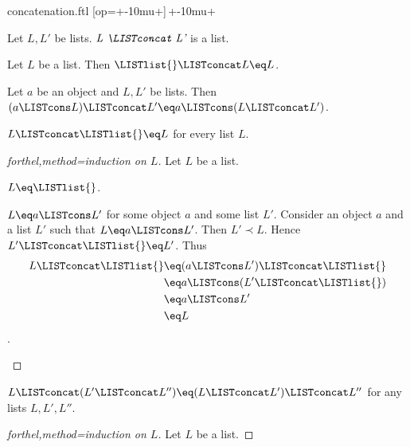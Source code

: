 \documentclass[lang=en,debug=all]{stex}
\begin{document}
\begin{smodule}{concatenation.ftl}
[op=+\mkern-10mu+]{\,\comp+\mkern-10mu\comp+\,}

\begin{signature}[forthel,id=LISTS_CONCAT_4578620297183232]
  Let $L, L'$ be lists.
  $\emph{L \LISTconcat L'}$ is a list.
\end{signature}

\begin{axiom}[forthel,id=LISTS_CONCAT_3703161885818880]
  Let $L$ be a list.
  Then $\LISTlist{} \LISTconcat L \eq L$.
\end{axiom}

\begin{axiom}[forthel,id=LISTS_CONCAT_8050301789536256]
  Let $a$ be an object and $L, L'$ be lists.
  Then $(a \LISTcons L) \LISTconcat L' \eq a \LISTcons (L \LISTconcat L')$.
\end{axiom}

\begin{proposition}[forthel,id=LISTS_CONCAT_4512036658964875]
  $L \LISTconcat \LISTlist{} \eq L$ for every list $L$.
\end{proposition}
\begin{proof}[forthel,method=induction on $L$]
  Let $L$ be a list.

  \begin{case}{$L \eq \LISTlist{}$.} \end{case}
  
  \begin{case}{$L \eq a \LISTcons L'$ for some object $a$ and some list $L'$.}
    Consider an object $a$ and a list $L'$ such that $L \eq a \LISTcons L'$.
    Then $L' \prec L$.
    Hence $L' \LISTconcat \LISTlist{} \eq L'$.
    Thus
    \begin{align*}
      L \LISTconcat \LISTlist{}
        &\eq (a \LISTcons L') \LISTconcat \LISTlist{}\\
        &\eq a \LISTcons (L' \LISTconcat \LISTlist{})\\
        &\eq a \LISTcons L'\\
        &\eq L
    \end{align*}.
  \end{case}
\end{proof}

\begin{proposition}[forthel,id=LISTS_CONCAT_1021563255448756]
  $L \LISTconcat (L' \LISTconcat L'') \eq (L \LISTconcat L') \LISTconcat L''$ for any lists $L, L', L''$.
\end{proposition}
\begin{proof}[forthel,method=induction on $L$]
  Let $L$ be a list.


\end{proof}
\end{smodule}
\end{document}
